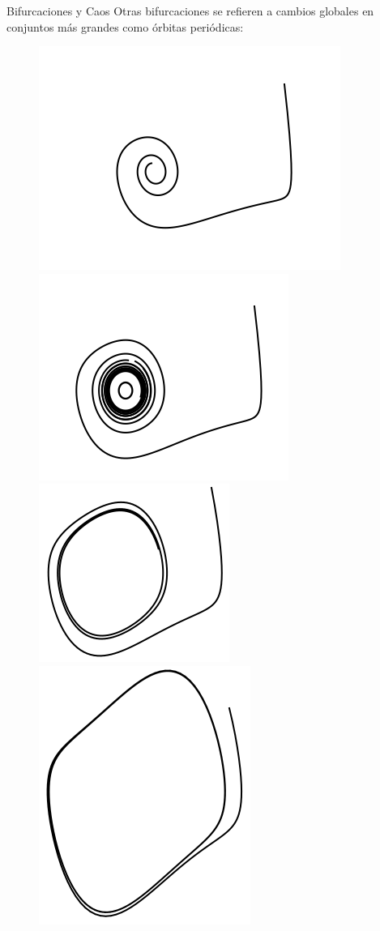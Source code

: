\documentclass{beamer}
\begin{document}
\begin{frame}{Bifurcaciones y Caos}
Otras bifurcaciones se refieren a cambios globales en conjuntos más grandes como órbitas periódicas:
\begin{figure}[!ht] \centering
	\includegraphics[scale=0.2]{../figures/vanderpol-hopfbifurcation--0_1.png}
	\includegraphics[scale=0.2]{../figures/vanderpol-hopfbifurcation-0_0.png} \\
	\includegraphics[scale=0.2]{../figures/vanderpol-hopfbifurcation-0_1.png}
	\includegraphics[scale=0.2]{../figures/vanderpol-hopfbifurcation-0_3.png}

\end{figure}
\end{frame}
\end{document}
